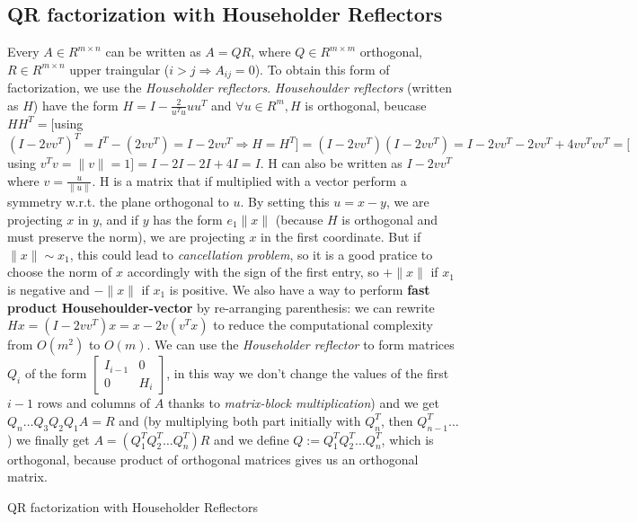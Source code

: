 \documentclass{article}
\begin{document}
\subsection{QR factorization with Householder Reflectors}
Every $A \in R^{m \times n}$ can be written as $A = QR$, where $Q \in R^{m \times m}$ orthogonal, $R \in R^{m \times n}$ upper traingular ($i > j \Rightarrow A_{ij} = 0$).
To obtain this form of factorization, we use the \textit{Householder reflectors}.
\textit{Househoulder reflectors} (written as $H$) have the form $H = I - \frac{2}{u^{T}u}uu^{T}$ and $\forall u \in R^{m}, H$ is orthogonal, beucase $HH^{T} =[$using $(I - 2vv^{T})^{T} = I^{T} - (2vv^{T}) = I - 2vv^{T} \Rightarrow H = H^{T}] = (I - 2vv^{T})(I - 2vv^{T}) = I - 2vv^{T} - 2vv^{T} + 4vv^{T}vv^{T} = [$using $ v^{T}v = \|v\| =  1] = I - 2I - 2I + 4I = I$.
H can also be written as $I - 2vv^{T}$ where $v = \frac{u}{\|u\|}$.
H is a matrix that if multiplied with a vector perform a symmetry w.r.t. the plane orthogonal to $u$.
By setting this $u=x-y$, we are projecting $x$ in $y$, and if $y$ has the form $e_{1}\|x\|$ (because $H$ is orthogonal and must preserve the norm), we are projecting $x$ in the first coordinate.
But if $\|x\| \sim x_{1}$, this could lead to \textit{cancellation problem}, so it is a good pratice to choose the norm of $x$ accordingly with the sign of the first entry, so $+\|x\|$ if $x_{1}$ is negative and $-\|x\|$ if $x_{1}$ is positive.
We also have a way to perform \textbf{fast product Househoulder-vector} by re-arranging parenthesis: we can rewrite $Hx = (I - 2vv^{T})x = x - 2v(v^{T}x)$ to reduce the computational complexity from $O(m^2)$ to $O(m)$.
We can use the \textit{Householder reflector} to form matrices $Q_{i}$ of the form $\begin{bmatrix} I_{i-1} & 0 \\ 0 & H_{i}\end{bmatrix}$, in this way we don't change the values of the first $i-1$ rows and columns of $A$ thanks to \textit{matrix-block multiplication}) and we get $Q_{n} \hdots Q_{3}Q_{2}Q_{1}A = R$ and (by multiplying both part initially with $Q_{n}^{T}$, then $Q_{n-1}^{T} \hdots$) we finally get $A = (Q_{1}^{T}Q_{2}^{T} \hdots Q_{n}^{T})R$ and we define $Q := Q_{1}^{T}Q_{2}^{T} \hdots Q_{n}^{T}$, which is orthogonal, because product of orthogonal matrices gives us an orthogonal matrix.
\makeatletter
\def\BState{\State\hskip-\ALG@thistlm}
\makeatother
\begin{algorithm}
\caption{QR factorization with Householder Reflectors}\label{euclid}
\end{algorithm}
\end{document}
